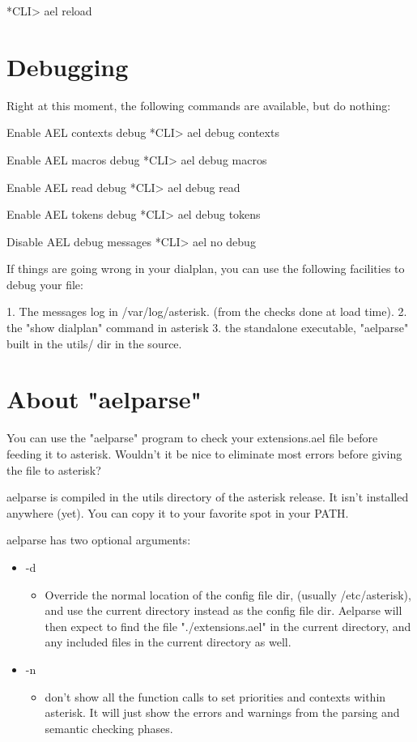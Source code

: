     *CLI> ael reload


\section{Debugging}

Right at this moment, the following commands are available, but do
nothing:

Enable AEL contexts debug
   *CLI> ael debug contexts

Enable AEL macros debug
   *CLI> ael debug macros

Enable AEL read debug
   *CLI> ael debug read

Enable AEL tokens debug
   *CLI> ael debug tokens

Disable AEL debug messages
   *CLI> ael no debug

If things are going wrong in your dialplan, you can use the following
facilities to debug your file:

1. The messages log in /var/log/asterisk. (from the checks done at load time).
2. the "show dialplan" command in asterisk
3. the standalone executable, "aelparse" built in the utils/ dir in the source.


\section{About "aelparse"}

You can use the "aelparse" program to check your extensions.ael
file before feeding it to asterisk. Wouldn't it be nice to eliminate
most errors before giving the file to asterisk?

aelparse is compiled in the utils directory of the asterisk release.
It isn't installed anywhere (yet). You can copy it to your favorite
spot in your PATH.

aelparse has two optional arguments:

\begin{itemize}
  \item -d
  \begin{itemize}
    \item Override the normal location of the config file dir, (usually
       /etc/asterisk), and use the current directory instead as the
       config file dir. Aelparse will then expect to find the file
       "./extensions.ael" in the current directory, and any included
       files in the current directory as well.
  \end{itemize}
  \item -n
  \begin{itemize}
    \item don't show all the function calls to set priorities and contexts
       within asterisk. It will just show the errors and warnings from
       the parsing and semantic checking phases.
  \end{itemize}
\end{itemize}

